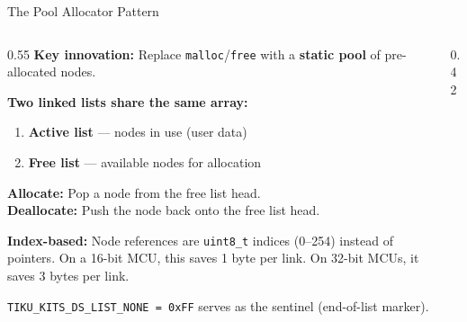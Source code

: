 \documentclass[aspectratio=169, 10pt]{beamer}
\begin{document}
\begin{frame}{The Pool Allocator Pattern}
\begin{columns}[T]
\begin{column}{0.55\textwidth}
\textbf{Key innovation:} Replace \texttt{malloc}/\texttt{free} with a
\textbf{static pool} of pre-allocated nodes.

\vspace{0.5em}
\textbf{Two linked lists share the same array:}
\begin{enumerate}
  \item \textbf{Active list} --- nodes in use (user data)
  \item \textbf{Free list} --- available nodes for allocation
\end{enumerate}

\vspace{0.5em}
\textbf{Allocate:} Pop a node from the free list head.\\
\textbf{Deallocate:} Push the node back onto the free list head.

\vspace{0.5em}
\textbf{Index-based:} Node references are \texttt{uint8\_t} indices
(0--254) instead of pointers. On a 16-bit MCU, this saves 1 byte per
link. On 32-bit MCUs, it saves 3 bytes per link.

\vspace{0.3em}
\texttt{TIKU\_KITS\_DS\_LIST\_NONE = 0xFF} serves as the
sentinel (end-of-list marker).
\end{column}

\begin{column}{0.42\textwidth}
\begin{center}
\end{center}
\end{column}
\end{columns}
\end{frame}
\end{document}

